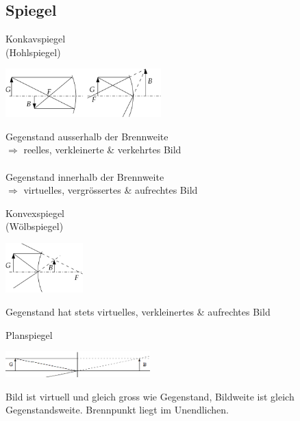 \newpage
\subsection{Spiegel  }
\begin{minipage}[]{3.5cm}
	Konkavspiegel\\
	(Hohlspiegel)
\end{minipage}
\begin{minipage}[]{7cm}
    \includegraphics[width=6cm]{./bilder/Konkavspiegel.png}
\end{minipage}
\begin{minipage}[]{8cm}
	\small
    Gegenstand ausserhalb der Brennweite \\
    	$\Rightarrow$ reelles, verkleinerte \& verkehrtes Bild \\ \\
    Gegenstand innerhalb der Brennweite \\
    	$\Rightarrow$ virtuelles, vergrössertes \& aufrechtes Bild
\end{minipage}

\begin{minipage}[]{3.5cm}
	Konvexspiegel\\
	(Wölbspiegel)
\end{minipage}
\begin{minipage}[]{7cm}
    \includegraphics[width=3cm]{./bilder/Konvexspiegel.png}
\end{minipage}
\begin{minipage}[]{8cm}
	\small
		Gegenstand hat stets virtuelles, verkleinertes \& aufrechtes Bild
\end{minipage}

\begin{minipage}[]{3.5cm}
	Planspiegel
\end{minipage}
\begin{minipage}[]{7cm}
	\includegraphics[height=1cm]{./bilder/Planspiegel.png}
\end{minipage}
\begin{minipage}[]{8cm}
	\small
		Bild ist virtuell und gleich gross wie Gegenstand, Bildweite ist gleich
		Gegenstandsweite. Brennpunkt liegt im Unendlichen.
\end{minipage}

